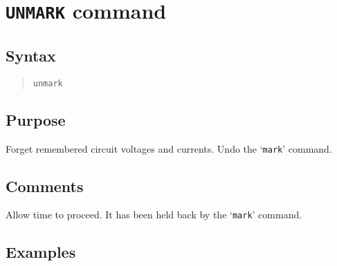 %
%
%
%
\section{{\tt UNMARK} command}
\subsection{Syntax}
\begin{verse}
{\tt unmark}
\end{verse}
\subsection{Purpose}

Forget remembered circuit voltages and currents.  Undo the `{\tt mark}'
command.
\subsection{Comments}

Allow time to proceed.  It has been held back by the `{\tt mark}' command.
\subsection{Examples}


